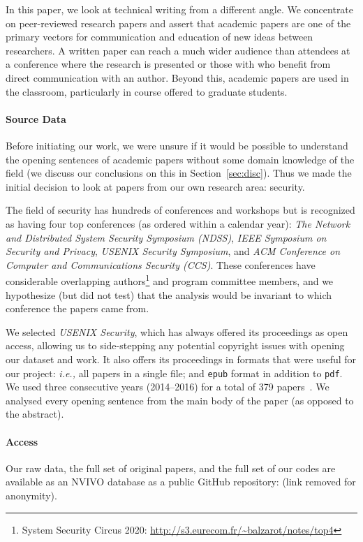 \documentclass[sigconf,anonymous]{acmart}
\newcommand{\ie}{\textit{i.e.,}\xspace}
\begin{document}
	In this paper, we look at technical writing from a different angle. We concentrate on peer-reviewed research papers and assert that academic papers are one of the primary vectors for communication and education of new ideas between researchers. A written paper can reach a much wider audience than attendees at a conference where the research is presented or those with who benefit from direct communication with an author. Beyond this, academic papers are used in the classroom, particularly in course offered to graduate students. 
	
	\paragraph{Source Data} Before initiating our work, we were unsure if it would be possible to understand the opening sentences of academic papers without some domain knowledge of the field (we discuss our conclusions on this in Section~\ref{sec:disc}). Thus we made the initial decision to look at papers from our own research area: security. 
	
	The field of security has hundreds of conferences and workshops but is recognized as having four top conferences (as ordered within a calendar year): \textit{The Network and Distributed System Security Symposium (NDSS)}, \textit{IEEE Symposium on Security and Privacy}, \textit{USENIX Security Symposium}, and \textit{ACM Conference on Computer and Communications Security (CCS)}. These conferences have considerable overlapping authors\footnote{System Security Circus 2020: \url{http://s3.eurecom.fr/~balzarot/notes/top4}} and program committee members, and we hypothesize (but did not test) that the analysis would be invariant to which conference the papers came from.
	
	We selected \textit{USENIX Security}, which has always offered its proceedings as open access, allowing us to side-stepping any potential copyright issues with opening our dataset and work. It also offers its proceedings in formats that were useful for our project: \ie all papers in a single file; and \texttt{epub} format in addition to \texttt{pdf}. We used three consecutive years (2014--2016) for a total of 379 papers~\cite{usenix14,usenix15,usenix16}. We analysed every opening sentence from the main body of the paper (as opposed to the abstract).
	
	\paragraph{Access} Our raw data, the full set of original papers, and the full set of our codes are available as an NVIVO database as a public GitHub repository: (link removed for anonymity). 
	
\end{document}
